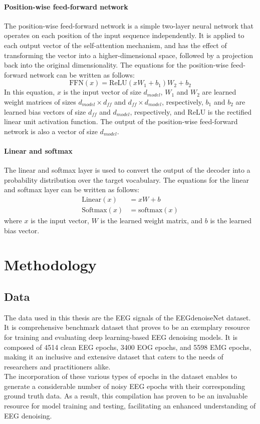 \documentclass[a4paper]{sapthesis}
\begin{document}
\subsubsection{Position-wise feed-forward network}
The position-wise feed-forward network is a simple two-layer neural 
network that operates on each position of the input sequence 
independently. It is applied to each output vector of the self-attention
 mechanism, and has the effect of transforming the vector into a 
 higher-dimensional space, followed by a projection back into the
  original dimensionality.\newline
The equations for the position-wise feed-forward network can be written
 as follows:
 \begin{equation}
   \text{FFN}(x) = \text{ReLU}(xW_1+b_1)W_2+b_2
   \end{equation}
 In this equation, $x$ is the input vector of size $d_{model}$,
  $W_1$ and $W_2$ are learned weight matrices of sizes 
  $d_{model}\times d_{ff}$ and $d_{ff}\times d_{model}$,
respectively, $b_1$ and $b_2$ are learned bias vectors of
size $d_{ff}$ and $d_{model}$, respectively, and ReLU is the
rectified linear unit activation function. The output of the
position-wise feed-forward network is also a vector of size $d_{model}$.
\subsubsection{Linear and softmax}
The linear and softmax layer is used to convert the output of the decoder
 into a probability distribution over the target vocabulary. The equations for the
   linear and softmax layer can be written as follows:
   \begin{align*}
     \text{Linear}(x) &= xW+b \\
     \text{Softmax}(x) &= \text{softmax}(x)
     \end{align*}
where $x$ is the input vector, $W$ is the learned weight matrix, and $b$
  is the learned bias vector.
\chapter{Methodology}
\section{Data}\label{sec:data}
The data used in this thesis are the EEG signals of the EEGdenoiseNet 
dataset\cite{EEGdenoiseNet}. It is comprehensive benchmark dataset
 that proves to be an exemplary resource for training and evaluating
  deep learning-based EEG denoising models. It is composed of 4514 clean 
  EEG epochs, 3400 EOG epochs, and 5598 EMG epochs, making it an inclusive 
  and extensive dataset that caters to the needs of researchers and
 practitioners alike.\newline \\
The incorporation of these various types of epochs in the dataset
enables to generate a considerable number of noisy EEG epochs
with their corresponding ground truth data. As a result, this compilation 
has proven to be an invaluable resource for model training and testing,
 facilitating an enhanced understanding of EEG denoising.
\end{document}
